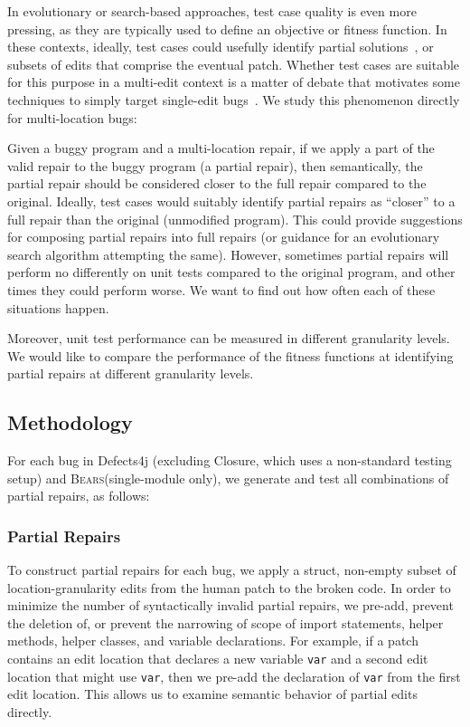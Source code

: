 \documentclass[10pt, conference]{IEEEtran}
\newcommand\bears{\textsc{Bears}\xspace}
\begin{document}
In evolutionary or search-based approaches, test case quality is
even more pressing, as they are typically used to define an objective or
fitness function.  In these contexts, ideally, test cases could usefully
identify partial solutions~\cite{better-fitness}, or subsets of edits that comprise the eventual
patch. Whether test cases are suitable for this purpose in a multi-edit context
is a matter of debate that motivates some techniques to simply target
single-edit bugs~\cite{ae,rsrepair}. We study this phenomenon directly for
multi-location bugs:


Given a buggy program and a multi-location repair, if we apply a part of the valid repair to 
the buggy program (a partial repair), then semantically, the partial repair should be considered closer
 to the full repair compared to the original. 
Ideally, test cases would suitably identify partial repairs as ``closer'' to a full repair than the original (unmodified program).  This could provide suggestions for composing partial repairs into full repairs (or guidance for an evolutionary search algorithm attempting the same).
%
However, sometimes partial repairs will perform no differently on unit tests compared 
to the original program, and other times they could perform worse. We want to find 
out how often each of these situations happen.

Moreover, unit test performance can be measured in different granularity levels. 
We would like to compare the performance of the fitness functions at identifying 
partial repairs at different granularity levels.


\subsection{Methodology}
\label{sec:partial-repair-methodology}

For each bug in  Defects4j 
(excluding Closure, which uses a non-standard testing setup)
and \bears (single-module only), we generate and test all combinations of partial repairs, as follows: 

\subsubsection{Partial Repairs}

To construct partial repairs for each bug, we apply a struct, non-empty subset 
of location-granularity edits from the human patch to the broken code.
In order to minimize the number of syntactically invalid partial repairs, 
we pre-add, prevent the deletion of, or prevent the narrowing of scope of 
import statements, helper methods, helper classes, and variable declarations.
For example, if a patch contains an edit location that declares a new variable 
\texttt{var} and a second edit location that might use \texttt{var}, then we 
pre-add the declaration of \texttt{var} from the first edit location. 
This allows us to examine semantic behavior of partial edits directly.
\end{document}
